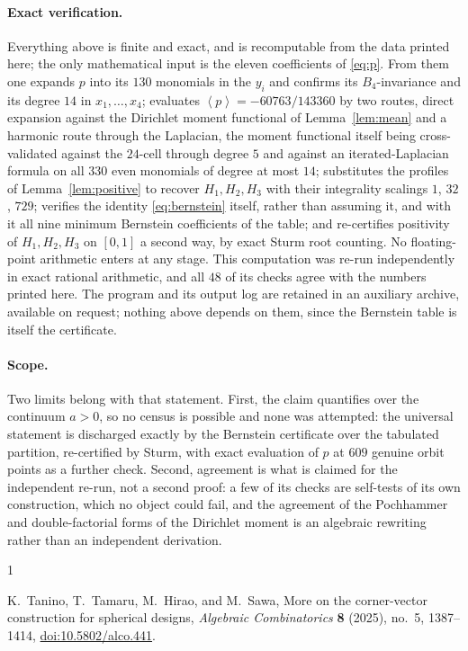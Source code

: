 \documentclass[11pt]{amsart}
\theoremstyle{remark}
\newcommand{\mean}[1]{\left\langle #1\right\rangle}
\begin{document}
\paragraph{Exact verification.}
Everything above is finite and exact, and is recomputable from the data
printed here; the only mathematical input is the eleven coefficients
of \eqref{eq:p}. From them one expands $p$ into its $130$ monomials in
the $y_i$ and confirms its $B_4$-invariance and its degree $14$ in
$x_1,\ldots,x_4$; evaluates $\mean{p}=-60763/143360$ by two routes,
direct expansion against the Dirichlet moment functional of
Lemma~\ref{lem:mean} and a harmonic route through the Laplacian, the
moment functional itself being cross-validated against the $24$-cell
through degree $5$ and against an iterated-Laplacian formula on all
$330$ even monomials of degree at most $14$; substitutes the profiles
of Lemma~\ref{lem:positive} to recover $H_1,H_2,H_3$ with their
integrality scalings $1$, $32$, $729$; verifies the identity
\eqref{eq:bernstein} itself, rather than assuming it, and with it all
nine minimum Bernstein coefficients of the table; and re-certifies
positivity of $H_1,H_2,H_3$ on $[0,1]$ a second way, by exact Sturm
root counting. No floating-point arithmetic enters at any stage. This
computation was re-run independently in exact rational arithmetic, and
all $48$ of its checks agree with the numbers printed here. The program
and its output log are retained in an auxiliary archive, available on
request; nothing above depends on them, since the Bernstein table is
itself the certificate.

\medskip

\paragraph{Scope.}
Two limits belong with that statement. First, the claim quantifies over
the continuum $a>0$, so no census is possible and none was attempted:
the universal statement is discharged exactly by the Bernstein
certificate over the tabulated partition, re-certified by Sturm, with
exact evaluation of $p$ at $609$ genuine orbit points as a further
check. Second, agreement is what is claimed for the independent re-run,
not a second proof: a few of its checks are self-tests of its own
construction, which no object could fail, and the agreement of the
Pochhammer and double-factorial forms of the Dirichlet moment is an
algebraic rewriting rather than an independent derivation.

\begin{thebibliography}{1}

K.~Tanino, T.~Tamaru, M.~Hirao, and M.~Sawa,
\newblock More on the corner-vector construction for spherical designs,
\newblock \emph{Algebraic Combinatorics} \textbf{8} (2025), no.~5,
1387--1414,
\newblock \href{https://doi.org/10.5802/alco.441}{doi:10.5802/alco.441}.

\end{thebibliography}
\end{document}
